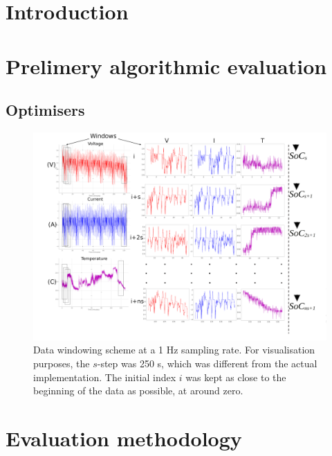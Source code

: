 \documentclass[energies,article,accept,pdftex,moreauthors]{Definitions/mdpi}
\begin{document}
\section{Introduction} \label{sec:Introduction}

\section{Prelimery algorithmic evaluation} \label{sec:Body}

    
    
    \subsection{Optimisers} \label{subsec:optimisers}
    
        
        
        
    
\startlandscape
    \begin{figure}[H]
        \centering
        \includegraphics[width=20cm]{II_Body/images/windowing3f-A3.jpg}
        \caption{Data windowing scheme at a 1 Hz sampling rate. For visualisation purposes, the $s$-step was 250 s, which was different from the actual implementation. The initial index $i$ was kept as close to the beginning of the data as possible, at around zero.}
        \label{fig:Windowing3f}
    \end{figure}
\finishlandscape
\section{Evaluation methodology} \label{sec:Meth}

    
    
    
    
\end{document}
